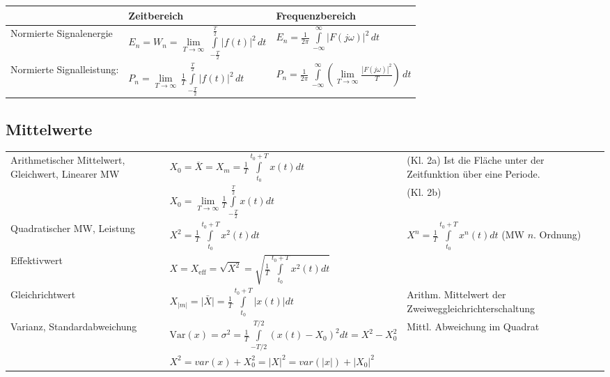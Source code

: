 \begin{tabular}{|p{6cm}|p{6cm}|p{6cm}|}
 \hline
 	&\textbf{Zeitbereich} &  \textbf{Frequenzbereich} \\
 \hline
	 Normierte Signalenergie & $E_n = W_n =
	 \lim\limits_{T\to\infty}\,\int\limits_{-\frac{T}{2}}^\frac{T}{2}|f(t)|^2\,dt$ &
	 $E_n = \frac{1}{2\pi}\,\int\limits_{-\infty}^\infty|F(j\omega)|^2\,dt$ \\
 \hline
	 Normierte Signalleistung: & $P_n = \lim\limits_{T\to\infty}\,
	 \frac{1}{T}\int\limits_{-\frac{T}{2}}^\frac{T}{2}|f(t)|^2\,dt$ &  $P_n = \frac{1}{2\pi}\,\int\limits_{-\infty}^\infty\left(
	 \lim\limits_{T\to\infty}\frac{|F(j\omega)|^2}{T}\right)\,dt$ \\
\hline
\end{tabular}


\subsection{Mittelwerte }
\begin{tabular}{p{4.6cm}p{7.4cm}p{6cm}}
	Arithmetischer Mittelwert, Gleichwert, Linearer MW &
	$X_0 = \overline{X} = X_m = \frac {1} {T} \int\limits_{t_0}^{t_0+T} x(t)dt$ &
	(Kl. 2a) Ist die Fläche unter der Zeitfunktion über eine Periode.
    \\
	& $X_0 = \lim\limits_{T\to\infty} \frac{1}{T} \int\limits_{-\frac{T}{2}}^{\frac{T}{2}}x(t)dt \qquad$ &
	(Kl. 2b)\\	
		
	Quadratischer MW, Leistung &
	$X^2 = \frac {1} {T} \int\limits_{t_0}^{t_0+T} x^2(t)dt$ & 
	$X^n = \frac {1} {T} \int\limits_{t_0}^{t_0+T} x^n(t)dt$ (MW $n$. Ordnung) 
	\\
	Effektivwert &
	$X = X_{\text{eff}}= \sqrt{X^2} = \sqrt{\frac{1}{T} \int\limits ^{t_0+T} _{t_0}{x^2(t)dt}}$
	& 
	\\
	Gleichrichtwert &
	$X_{|m|} = \bar{|X|} = \frac{1}{T} \int\limits_{t_0}^{t_0+T}{|x(t)| dt}$ &
    Arithm. Mittelwert der Zweiweggleichrichterschaltung
    \\
	Varianz, Standardabweichung	&
	$\text{Var}(x)=\sigma^2= \frac {1} {T} \int\limits_{-T/2}^{T/2}(x(t)-X_0)^2dt = X^2-X_0^2$ &
	Mittl. Abweichung im Quadrat
	\\
	& $X^2 = var(x)+X_0^2 = |X|^2 = var(|x|) + |X_0|^2$ & \\
\end{tabular}

\newpage

